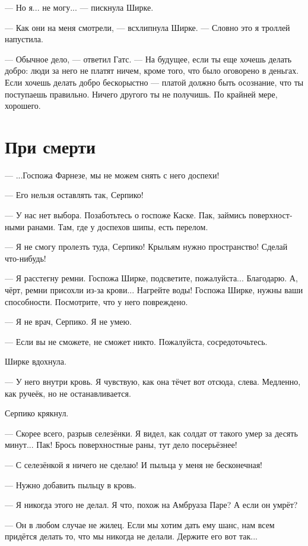 \documentclass[a4paper,12pt,fleqn]{book}\usepackage{polyglossia}\setdefaultlanguage[babelshorthands=true]{russian}\setotherlanguage{english}\defaultfontfeatures{Ligatures=TeX,Mapping=tex-text}\usepackage{xcolor}\newcommand{\ml}[3]{#2}
\newcommand{\asterism}{\vspace{1em}{\centering\Large\bfseries$\ast~\ast~\ast$\par}\vspace{1em}}
\begin{document}
--- Но я... не могу... --- пискнула Ширке.

\asterism

--- Как они на меня смотрели, --- всхлипнула Ширке.
--- Словно это я троллей напустила.

--- Обычное дело, --- ответил Гатс.
--- На будущее, если ты еще хочешь делать добро: люди за него не платят ничем, кроме того, что было оговорено в деньгах.
Если хочешь делать добро бескорыстно --- платой должно быть осознание, что ты поступаешь правильно.
Ничего другого ты не получишь.
По крайней мере, хорошего.

\section{При смерти}

--- ...Госпожа Фарнезе, мы не можем снять с него доспехи!

--- Его нельзя оставлять так, Серпико!

--- У нас нет выбора.
Позаботьтесь о госпоже Каске.
Пак, займись поверхностными ранами.
Там, где у доспехов шипы, есть перелом.

--- Я не смогу пролезть туда, Серпико!
Крыльям нужно пространство!
Сделай что-нибудь!

--- Я расстегну ремни.
Госпожа Ширке, подсветите, пожалуйста...
Благодарю.
А, чёрт, ремни присохли из-за крови...
Нагрейте воды!
Госпожа Ширке, нужны ваши способности.
Посмотрите, что у него повреждено.

--- Я не врач, Серпико.
Я не умею.

--- Если вы не сможете, не сможет никто.
Пожалуйста, сосредоточьтесь.

Ширке вдохнула.

--- У него внутри кровь.
Я чувствую, как она тёчет вот отсюда, слева.
Медленно, как ручеёк, но не останавливается.

Серпико крякнул.

--- Скорее всего, разрыв селезёнки.
Я видел, как солдат от такого умер за десять минут...
Пак!
Брось поверхностные раны, тут дело посерьёзнее!

--- С селезёнкой я ничего не сделаю!
И пыльца у меня не бесконечная!

--- Нужно добавить пыльцу в кровь.

--- Я никогда этого не делал.
Я что, похож на Амбруаза Паре?
А если он умрёт?

--- Он в любом случае не жилец.
Если мы хотим дать ему шанс, нам всем придётся делать то, что мы никогда не делали.
Держите его вот так...
\end{document}
